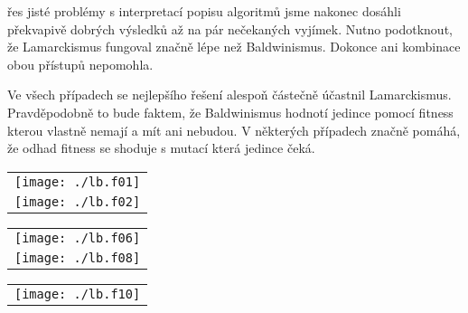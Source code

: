 \documentclass[a4paper]{article}
\newenvironment{ukol}[3][]{\begin{trivlist} 
\item[\hskip \labelsep {\bfseries #1}\hskip \labelsep {\bfseries #2}]}{\end{trivlist}}
\begin{document}
\begin{ukol}{Lamarckismus a Baldwinismus}

	Přes jisté problémy s interpretací popisu algoritmů jsme nakonec dosáhli překvapivě dobrých výsledků až na pár nečekaných vyjímek. Nutno podotknout,
	že Lamarckismus fungoval značně lépe než Baldwinismus. Dokonce ani kombinace obou přístupů nepomohla.

	Ve všech případech se nejlepšího řešení alespoň částečně účastnil Lamarckismus. Pravděpodobně to bude faktem, že Baldwinismus hodnotí jedince pomocí 
	fitness kterou vlastně nemají a mít ani nebudou. V některých případech značně pomáhá, že odhad fitness se shoduje s mutací která jedince čeká.

\begin{center}
	\begin{tabular}{ c }
		\texttt{[image: ./lb.f01]} \\ 
		\texttt{[image: ./lb.f02]} \\ 
	\end{tabular}
\end{center}

\begin{center}
	\begin{tabular}{ c }
		\texttt{[image: ./lb.f06]} \\
		\texttt{[image: ./lb.f08]} \\ 
	\end{tabular}
\end{center}

\begin{center}
	\begin{tabular}{ c }
		\texttt{[image: ./lb.f10]} \\ 
	\end{tabular}
\end{center}
\end{ukol}
\end{document}
